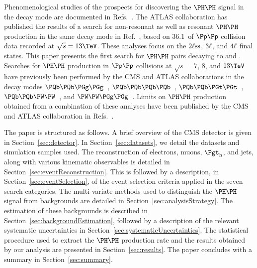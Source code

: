 Phenomenological studies of the prospects for discovering the $\HH$ signal in the \WWWW decay mode
are documented in Refs.~\cite{Baur:2002rb,Baur:2002qd,Li:2015yia,Adhikary:2017jtu,Ren:2017jbg}.
The ATLAS collaboration has published the results of a search for non-resonant as well as resonant $\HH$ production in the same decay mode in Ref.~\cite{Aaboud:2018ksn},
based on 36.1~\fbinv of $\Pp\Pp$ collision data recorded at $\sqrt{s} = 13\TeV$.
These analyses focus on the $2\ell\text{ss}$, $3\ell$, and $4\ell$ final states.
This paper presents the first search for $\HH$ pairs decaying to \WWtt and \tttt.
Searches for $\HH$ production in $\Pp\Pp$ collisions at $\sqrt{s} = 7$, $8$, and $13\TeV$
have previously been performed by the CMS and ATLAS collaborations in the decay modes 
$\Pbottom\Pbottom\PGg\PGg$~\cite{Aad:2014yja,Khachatryan:2016sey,Sirunyan:2018iwt,Aaboud:2018ftw}, 
$\Pbottom\Pbottom\Pbottom\Pbottom$~\cite{Khachatryan:2015yea,Aad:2015uka,Aaboud:2018knk,Sirunyan:2018zkk,Sirunyan:2018tki}, 
$\Pbottom\Pbottom\PGt\PGt$~\cite{Aad:2015xja,Sirunyan:2017tqo,Sirunyan:2017djm,Aaboud:2018sfw}, 
$\Pbottom\Pbottom\PW\PW$~\cite{Sirunyan:2017guj}, 
and $\PW\PW\PGg\PGg$~\cite{Aaboud:2018ewm}.
Limits on $\HH$ production obtained from a combination of these analyses have been published by the CMS and ATLAS collaboration 
in Refs.~\cite{Aad:2015xja,Sirunyan:2017tqo,Sirunyan:2018ayu}.

The paper is structured as follows.
A brief overview of the CMS detector is given in Section~\ref{sec:detector}.
In Section~\ref{sec:datasets}, we detail the datasets and simulation samples used.
The reconstruction of electrons, muons, $\tauh$, and jets,
along with various kinematic observables is detailed in Section~\ref{sec:eventReconstruction}.
This is followed by a description, in Section~\ref{sec:eventSelection}, of the event selection criteria applied in the seven search categories.
The multi-variate methods used to distinguish the $\HH$ signal from backgrounds are detailed in Section~\ref{sec:analysisStrategy}.
The estimation of these backgrounds is described in Section~\ref{sec:backgroundEstimation},
followed by a description of the relevant systematic uncertainties in Section~\ref{sec:systematicUncertainties}.
The statistical procedure used to extract the $\HH$ production rate and the results obtained by our analysis are presented in Section~\ref{sec:results}.
The paper concludes with a summary in Section~\ref{sec:summary}.
